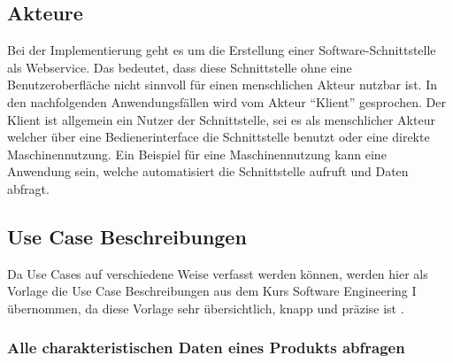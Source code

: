 \subsection{Akteure}
Bei der Implementierung geht es um die Erstellung einer Software-Schnittstelle als \gls{Webservice}. Das bedeutet, dass diese Schnittstelle ohne eine Benutzeroberfläche nicht sinnvoll für einen menschlichen Akteur nutzbar ist. In den nachfolgenden Anwendungsfällen wird vom Akteur \enquote{Klient} gesprochen. Der Klient ist allgemein ein Nutzer der Schnittstelle, sei es als menschlicher Akteur welcher über eine Bedienerinterface die Schnittstelle benutzt oder eine direkte Maschinennutzung. Ein Beispiel für eine Maschinennutzung kann eine Anwendung sein, welche automatisiert die Schnittstelle aufruft und Daten abfragt.    

\subsection{Use Case Beschreibungen}

Da \glspl{Use Case} auf verschiedene Weise verfasst werden können, werden hier als Vorlage die \gls{Use Case} Beschreibungen aus dem Kurs Software Engineering I übernommen, da diese Vorlage sehr übersichtlich, knapp und präzise ist \citep[Vgl.][S. 120ff]{sixse1}. 

\subsubsection{Alle charakteristischen Daten eines Produkts abfragen}

